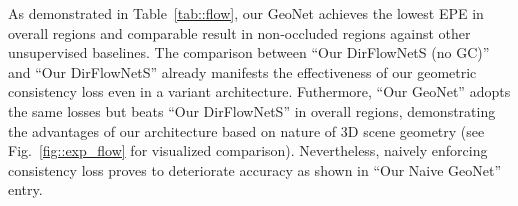 \documentclass[10pt,twocolumn,letterpaper]{article}
\begin{document}
As demonstrated in Table~\ref{tab::flow}, our GeoNet achieves the lowest EPE in overall regions and comparable result in non-occluded regions against other unsupervised baselines. 
The comparison between ``Our DirFlowNetS (no GC)'' and ``Our DirFlowNetS'' already manifests the effectiveness of our geometric consistency loss even in a variant architecture. Futhermore, ``Our GeoNet'' adopts the same losses but beats ``Our DirFlowNetS'' in overall regions, demonstrating the advantages of our architecture based on nature of 3D scene geometry (see Fig.~\ref{fig::exp_flow} for visualized comparison). 
Nevertheless, naively enforcing consistency loss proves to deteriorate accuracy %
as shown in ``Our Naive GeoNet'' entry. 
\end{document}
